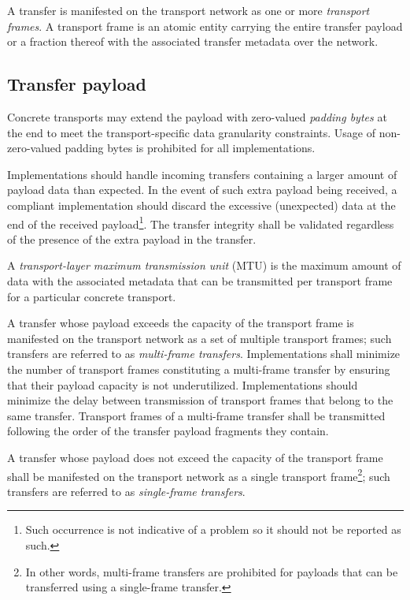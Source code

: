 A transfer is manifested on the transport network as one or more \emph{transport frames}.
A transport frame is an atomic entity carrying the entire transfer payload or a fraction thereof
with the associated transfer metadata over the network.

\subsection{Transfer payload}\label{sec:transport_transfer_payload}

Concrete transports may extend the payload with zero-valued \emph{padding bytes} at the end
to meet the transport-specific data granularity constraints.
Usage of non-zero-valued padding bytes is prohibited for all implementations.

Implementations should handle incoming transfers containing a larger amount of payload data than expected.
In the event of such extra payload being received, a compliant implementation should
discard the excessive (unexpected) data at the end of the received payload\footnote{%
    Such occurrence is not indicative of a problem so it should not be reported as such.
}.
The transfer integrity shall be validated regardless of the presence of the extra payload in the transfer.

A \emph{transport-layer maximum transmission unit} (MTU) is the maximum amount of data with the associated metadata
that can be transmitted per transport frame for a particular concrete transport.

A transfer whose payload exceeds the capacity of the transport frame is manifested on the transport network
as a set of multiple transport frames; such transfers are referred to as \emph{multi-frame transfers}.
Implementations shall minimize the number of transport frames constituting a multi-frame transfer by ensuring that
their payload capacity is not underutilized.
Implementations should minimize the delay between transmission of transport frames that belong to the same transfer.
Transport frames of a multi-frame transfer shall be transmitted following the order of the
transfer payload fragments they contain.

A transfer whose payload does not exceed the capacity of the transport frame shall be manifested on the transport
network as a single transport frame\footnote{%
    In other words, multi-frame transfers are prohibited for payloads that can be transferred
    using a single-frame transfer.
}; such transfers are referred to as \emph{single-frame transfers}.

